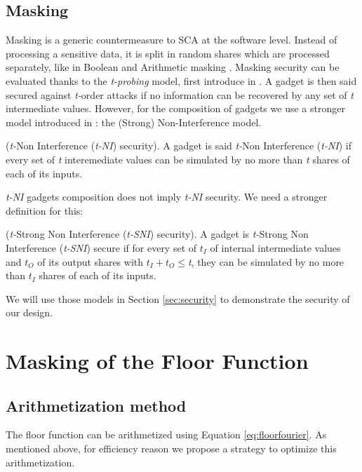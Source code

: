\documentclass[runningheads]{llncs}
\begin{document}
\subsection{Masking}
Masking is a generic countermeasure to SCA at the software level. Instead of processing a sensitive data, it is split in random shares which are processed separately, like in Boolean and Arithmetic masking \cite{mangard2008power}. Masking security can be evaluated thanks to the \emph{t-probing} model, first introduce in \cite{ishai2003private}. A gadget is then said secured against \emph{t-}order attacks if no information can be recovered by any set of \emph{t} intermediate values. However, for the composition of gadgets we use a stronger model introduced in \cite{barthe2016strong}: the (Strong) Non-Interference model.
\begin{definition}
  (\emph{t-}Non Interference (\emph{t-NI}) security). A gadget is said \emph{t-}Non Interference (\emph{t-NI}) if every set of \emph{t} interemediate values can be simulated by no more than \emph{t} shares of each of its inputs.
\end{definition}
\emph{t-NI} gadgets composition does not imply \emph{t-NI} security. We need a stronger definition for this:
\begin{definition}
  (\emph{t-}Strong Non Interference (\emph{t-SNI}) security). A gadget is \emph{t-}Strong Non Interference (\emph{t-SNI}) secure if for every set of $t_I$ of internal intermediate values and $t_O$ of its output shares with $t_I + t_O \leq$\emph{t}, they can be simulated by no more than $t_I$ shares of each of its inputs.
\end{definition}

We will use those models in Section \ref{sec:security} to demonstrate the security of our design.


\section{Masking of the Floor Function}\label{sec:maskfloor}
\subsection{Arithmetization method}
The floor function can be arithmetized using Equation \ref{eq:floorfourier}. As mentioned above, for efficiency reason we propose a strategy to optimize this arithmetization.
\end{document}
